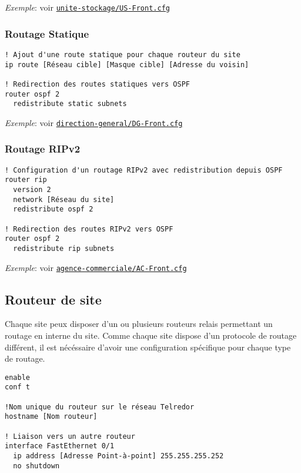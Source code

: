 \documentclass{article}
\newcommand{\seefile}[1]{
  \begin{center}
  \begin{minipage}{0.9\textwidth}
    \emph{Exemple}: voir \texttt{\href{https://github.com/EpicKiwi/Wide-Network-Project-Cesi-A4/blob/master/network/#1}{#1}}
  \end{minipage}
  \end{center}
}
\begin{document}
\seefile{unite-stockage/US-Front.cfg}

\subsubsection{Routage Statique}

\begin{lstlisting}[caption=Configuration d'un routeur "Front" avec routage statique]
! Ajout d'une route statique pour chaque routeur du site
ip route [Réseau cible] [Masque cible] [Adresse du voisin]

! Redirection des routes statiques vers OSPF
router ospf 2
  redistribute static subnets
\end{lstlisting}

\seefile{direction-general/DG-Front.cfg}

\subsubsection{Routage RIPv2}

\begin{lstlisting}[caption=Configuration d'un routeur "Front" avec RIPv2]
! Configuration d'un routage RIPv2 avec redistribution depuis OSPF
router rip
  version 2
  network [Réseau du site]
  redistribute ospf 2

! Redirection des routes RIPv2 vers OSPF
router ospf 2
  redistribute rip subnets
\end{lstlisting}

\seefile{agence-commerciale/AC-Front.cfg}

\subsection{Routeur de site}

Chaque site peux disposer d'un ou plusieurs routeurs relais permettant un routage en interne du site.
Comme chaque site dispose d'un protocole de routage différent, il est nécéssaire d'avoir une configuration spécifique pour chaque type de routage.

\begin{lstlisting}[caption=Configuration de base d'un routeur de site]
enable
conf t

!Nom unique du routeur sur le réseau Telredor
hostname [Nom routeur]

! Liaison vers un autre routeur
interface FastEthernet 0/1
  ip address [Adresse Point-à-point] 255.255.255.252
  no shutdown
\end{lstlisting}
\end{document}
